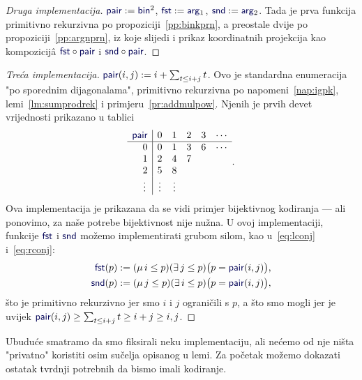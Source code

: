 \begin{proof}[Druga implementacija] $\f{pair}:=\f{bin}^2$, $\f{fst}:=\f{arg}_1$, $\f{snd}:=\f{arg}_2$. Tada je prva funkcija primitivno rekurzivna po propoziciji~\ref{pp:binkprn}, a preostale dvije po propoziciji~\ref{pp:argnprn}, iz koje slijedi i prikaz koordinatnih projekcija kao kompozicijâ $\f{fst}\circ\f{pair}$ i $\f{snd}\circ\f{pair}$.
\end{proof}

\begin{proof}[Treća implementacija] $\f{pair}(i,j):=i+\sum_{t\le i+j}t$. Ovo je standardna enumeracija "po sporednim dijagonalama", primitivno rekurzivna po napomeni~\ref{nap:igpk}, lemi~\ref{lm:sumprodrek} i primjeru~\ref{pr:addmulpow}. Njenih je prvih devet vrijednosti prikazano u tablici \begin{equation}
\begin{array}{r|ccccc}
\f{pair}&0&1&2&3&\cdots\\\hline
0&0&1&3&6&\cdots\\
1&2&4&7\\
2&5&8\\
\vdots\,&\vdots&\vdots\\
\end{array}\text.
\end{equation}
Ova implementacija je prikazana da se vidi primjer bijektivnog kodiranja --- ali ponovimo, za naše potrebe bijektivnost nije nužna. U ovoj implementaciji, funkcije $\f{fst}$ i $\f{snd}$ možemo implementirati grubom silom, kao u~\eqref{eq:lconj} i~\eqref{eq:rconj}:
\begin{align}
    \f{fst}(p)&:=(\mu\,i\le p)(\exists\,j\le p)\bigl(p=\f{pair}(i,j)\bigr)\text,\\
    \f{snd}(p)&:=(\mu\,j\le p)(\exists\,i\le p)\bigl(p=\f{pair}(i,j)\bigr)\text,
\end{align}
što je primitivno rekurzivno jer smo $i$ i $j$ ograničili s $p$, a što smo mogli jer je uvijek $\f{pair}(i,j)\ge\sum_{t\le i+j}t\ge i+j\ge i,j$.
\end{proof}

Ubuduće smatramo da smo fiksirali neku implementaciju, ali nećemo od nje ništa "privatno" koristiti osim sučelja opisanog u lemi. Za početak možemo dokazati ostatak tvrdnji potrebnih da bismo imali kodiranje.

